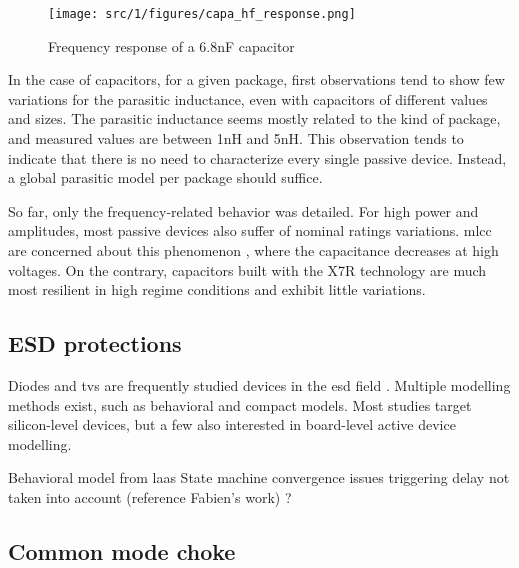 \begin{figure}[!h]
  \centering
  \texttt{[image: src/1/figures/capa\_hf\_response.png]}
  \caption{Frequency response of a 6.8nF capacitor}
  \label{fig:frequency-response-capa}
\end{figure}

In the case of capacitors, for a given package, first observations tend to show few variations for the parasitic inductance, even with capacitors of different values and sizes.
The parasitic inductance seems mostly related to the kind of package, and measured values are between 1nH and 5nH.
This observation tends to indicate that there is no need to characterize every single passive device.
Instead, a global parasitic model per package should suffice.

So far, only the frequency-related behavior was detailed.
For high power and amplitudes, most passive devices also suffer of nominal ratings variations.
\gls{mlcc} are concerned about this phenomenon \cite{capa-esd-cz}, where the capacitance decreases at high voltages.
On the contrary, capacitors built with the X7R technology are much most resilient in high regime conditions and exhibit little variations.


\subsection{ESD protections}
\label{esd-protection-modelling}


Diodes and \gls{tvs} are frequently studied devices in the \gls{esd} field \cite{modelling-diode-esd, esd-diode-compact-model, tvs-modeling}.
Multiple modelling methods exist, such as behavioral and compact models.
Most studies target silicon-level devices, but a few also interested in board-level active device modelling.

Behavioral model from laas
State machine
convergence issues
triggering delay not taken into account (reference Fabien's work) ?



\subsection{Common mode choke}

